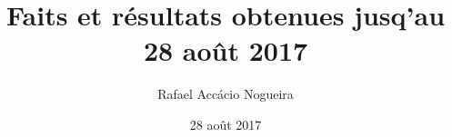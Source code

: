\newcommand{\conteudo}{\tableofcontents\label{tocsection}}


\pagestyle{fancy}
\newif\ifdebug
\newcommand\todo[1]{\ifdebug {\color{red}#1}\fi}
\newcommand\doing[1]{\ifdebug {\color{blue}#1}\fi}


\fancyhead[CO]{\title}
\fancyhead[CE]{\subtitle}
\fancyhead[R]{\todo{DEBUG ON}}
\fancyhead[L]{\todo{DEBUG ON}}

\fancyfoot[R]{\todo{DEBUG ON}}
\fancyfoot[L]{\todo{DEBUG ON}}
\fancyfoot[C]{\thepage}

\allowdisplaybreaks
\title{Faits et résultats obtenues jusq'au 28 août 2017 }
\author{Rafael Accácio Nogueira}
\date{28 août 2017}

